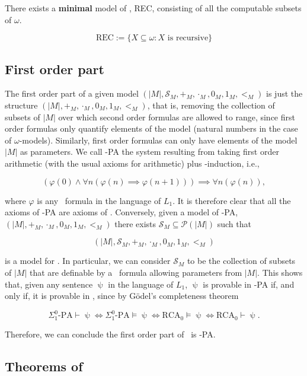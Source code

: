 \documentclass[../main.tex]{memoir}
\begin{document}
\begin{corollary}
  \label{corollary:rec-model}
  There exists a \textbf{minimal} model of \rca, REC, consisting of all the computable subsets of $\omega$.

  \[ \text{REC} := \{X \subseteq \omega: X \text{ is recursive}\} \]
\end{corollary}

\subsection{First order part}

The first order part of a given model $(|M|, \mathcal{S}_M, +_M, \cdot_M, 0_M, 1_M, <_M)$ is just the structure $(|M|, +_M, \cdot_M, 0_M, 1_M, <_M)$, that is, removing the collection of subsets of $|M|$ over which second order formulas are allowed to range, since first order formulas only quantify elements of the model (natural numbers in the case of $\omega$-models). Similarly, first order formulas can only have elements of the model $|M|$ as parameters. We call \re-PA the system resulting from taking first order arithmetic (with the usual axioms for arithmetic) plus \re-induction, i.e.,

\[ (\varphi(0) \land \forall n (\varphi(n) \implies \varphi(n + 1))) \implies \forall n (\varphi(n)), \]

where $\varphi$ is any \re\ formula in the language of $L_1$. It is therefore clear that all the axioms of \re-PA are axioms of \rca. Conversely, given a model of \re-PA, $(|M|, +_M, \cdot_M, 0_M, 1_M, <_M)$ there exists $\mathcal{S}_M \subseteq \mathcal{P}(|M|)$ such that

\[ (|M|, \mathcal{S}_M, +_M, \cdot_M, 0_M, 1_M, <_M) \]

is a model for \rca. In particular, we can consider $\mathcal{S}_M$ to be the collection of subsets of $|M|$ that are definable by a \rec\ formula allowing parameters from $|M|$. This shows that, given any sentence $\uppsi$ in the language of $L_1$, $\uppsi$ is provable in \re-PA if, and only if, it is provable in \rca, since by Gödel's completeness theorem

\[ \Sigma_1^0\text{-PA} \vdash \uppsi \iff \Sigma_1^0\text{-PA} \vDash \uppsi \iff \text{RCA}_0 \vDash \uppsi \iff \text{RCA}_0 \vdash \uppsi. \]

Therefore, we can conclude the first order part of \rca\ is \re-PA.

\subsection{Theorems of \rca}
\end{document}
